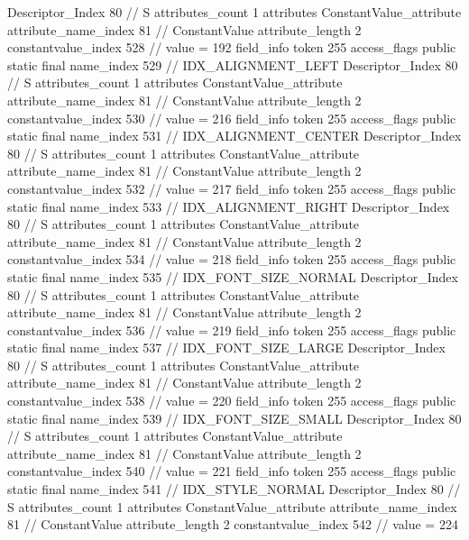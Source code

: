 {{{{{				Descriptor_Index	80		// S
				attributes_count	1
				attributes {
				ConstantValue_attribute {
					attribute_name_index	81		// ConstantValue
					attribute_length	2
					constantvalue_index	528		// value = 192
				}
				}
			}
			field_info {
				token	255
				access_flags	public static final
				name_index	529		// IDX_ALIGNMENT_LEFT
				Descriptor_Index	80		// S
				attributes_count	1
				attributes {
				ConstantValue_attribute {
					attribute_name_index	81		// ConstantValue
					attribute_length	2
					constantvalue_index	530		// value = 216
				}
				}
			}
			field_info {
				token	255
				access_flags	public static final
				name_index	531		// IDX_ALIGNMENT_CENTER
				Descriptor_Index	80		// S
				attributes_count	1
				attributes {
				ConstantValue_attribute {
					attribute_name_index	81		// ConstantValue
					attribute_length	2
					constantvalue_index	532		// value = 217
				}
				}
			}
			field_info {
				token	255
				access_flags	public static final
				name_index	533		// IDX_ALIGNMENT_RIGHT
				Descriptor_Index	80		// S
				attributes_count	1
				attributes {
				ConstantValue_attribute {
					attribute_name_index	81		// ConstantValue
					attribute_length	2
					constantvalue_index	534		// value = 218
				}
				}
			}
			field_info {
				token	255
				access_flags	public static final
				name_index	535		// IDX_FONT_SIZE_NORMAL
				Descriptor_Index	80		// S
				attributes_count	1
				attributes {
				ConstantValue_attribute {
					attribute_name_index	81		// ConstantValue
					attribute_length	2
					constantvalue_index	536		// value = 219
				}
				}
			}
			field_info {
				token	255
				access_flags	public static final
				name_index	537		// IDX_FONT_SIZE_LARGE
				Descriptor_Index	80		// S
				attributes_count	1
				attributes {
				ConstantValue_attribute {
					attribute_name_index	81		// ConstantValue
					attribute_length	2
					constantvalue_index	538		// value = 220
				}
				}
			}
			field_info {
				token	255
				access_flags	public static final
				name_index	539		// IDX_FONT_SIZE_SMALL
				Descriptor_Index	80		// S
				attributes_count	1
				attributes {
				ConstantValue_attribute {
					attribute_name_index	81		// ConstantValue
					attribute_length	2
					constantvalue_index	540		// value = 221
				}
				}
			}
			field_info {
				token	255
				access_flags	public static final
				name_index	541		// IDX_STYLE_NORMAL
				Descriptor_Index	80		// S
				attributes_count	1
				attributes {
				ConstantValue_attribute {
					attribute_name_index	81		// ConstantValue
					attribute_length	2
					constantvalue_index	542		// value = 224
}}}}}}}
